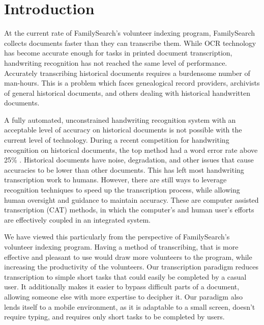 \documentclass[ms]{byuprop}
\title{\Title}
\author{\Author}
\begin{document}
\maketitle

\section{Introduction}
At the current rate of FamilySearch's volunteer indexing program, FamilySearch collects documents faster than they can transcribe them. While OCR technology has become accurate enough for tasks in printed document transcription, handwriting recognition has not reached the same level of performance. Accurately transcribing historical documents requires a burdensome number of man-hours. This is a problem which faces genealogical record providers, archivists of general historical documents, and others dealing with historical handwritten documents.

A fully automated, unconstrained handwriting recognition system with an acceptable level of accuracy on historical documents is not possible with the current level of technology. During a recent competition for handwriting recognition on historical documents, the top method had a word error rate above 25\% \cite{icdarComp2015}.  Historical documents have noise, degradation, and other issues that cause accuracies to be lower than other documents. This has left most handwriting transcription work to humans. However, there are still ways to leverage recognition techniques to speed up the transcription process, while allowing human oversight and guidance to maintain accuracy. These are computer assisted transcription (CAT) methods, in which the computer's and human user's efforts are effectively coupled in an integrated system.


We have viewed this particularly from the perspective of FamilySearch's volunteer indexing program. Having a method of transcribing, that is more effective and pleasant to use would  draw more volunteers to the program, while increasing the productivity of the volunteers. Our transcription paradigm reduces transcription to simple short tasks that could easily be completed by a casual user. It additionally makes it easier to bypass difficult parts of a document, allowing someone else with more expertise to decipher it. Our paradigm also lends itself to a mobile environment, as it is adaptable to a small screen, doesn't require typing, and requires only short tasks to be completed by users.
\end{document}
